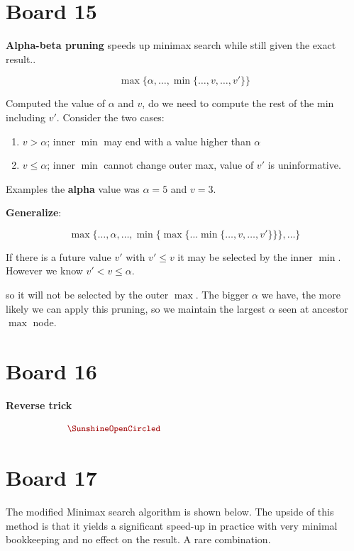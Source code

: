 \documentclass[11pt]{article}
\begin{document}
\section{Board 15}

\textbf{Alpha-beta pruning} speeds up minimax search while still given the exact result.. 



\[ \max\{ \alpha, \ldots,  \min\{\ldots, v, \ldots, v' \} \}\]
  
\noindent Computed the value of $\alpha$ and $v$, do we need to compute the rest of the min including $v'$. Consider the two cases:

\begin{enumerate}
\item  $v > \alpha$; inner $\min$ may end with a value higher than $\alpha$ 
\item  $v \leq \alpha$; inner $\min$ cannot change outer max,  value of $v'$ is uninformative. 
\end{enumerate}

Examples the \textbf{alpha} value was $\alpha = 5$ and $v=3$. 

\textbf{Generalize}:

\[ \max\{ \ldots, \alpha, \ldots, \min\{ \max\{\ldots \min\{\ldots, v, \ldots, v' \} \}\} , \ldots\}\]

If there is a future value $v'$ with $v' \leq v$ it may be selected by the inner $\min$. However we know $v' < v \leq \alpha$.

so it will not be selected by the outer $\max$. The bigger $\alpha$ we have, the more likely we can apply this pruning, so we maintain the largest $\alpha$ seen at ancestor $\max$ node. 


\section{Board 16}

\textbf{Reverse trick}

\[ \censorm{\min\{ \ldots, \beta, \ldots, \max\{ \min\{\ldots \min\{\ldots, v, \ldots, v' \} \}\} , \ldots\} }\]


\section{Board 17}
The modified Minimax search algorithm is shown below.
The upside of this method is that it yields a significant speed-up in practice with very minimal bookkeeping and no effect on the result. A rare combination.
\end{document}
